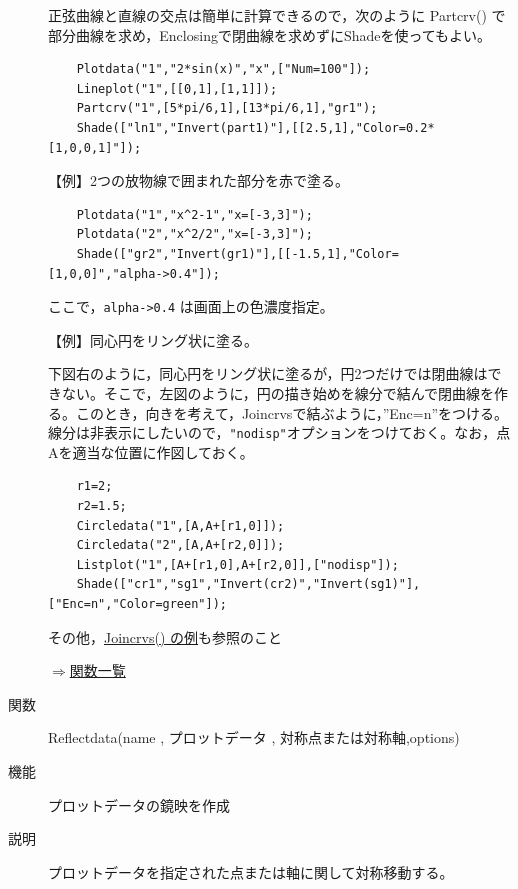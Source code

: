 \documentclass[papersize,a4paper,12pt,uplatex]{jsarticle}
\begin{document}
\begin{description}
正弦曲線と直線の交点は簡単に計算できるので，次のように Partcrv() で部分曲線を求め，Enclosingで閉曲線を求めずにShadeを使ってもよい。
\begin{verbatim}
    Plotdata("1","2*sin(x)","x",["Num=100"]);
    Lineplot("1",[[0,1],[1,1]]);
    Partcrv("1",[5*pi/6,1],[13*pi/6,1],"gr1");
    Shade(["ln1","Invert(part1)"],[[2.5,1],"Color=0.2*[1,0,0,1]"]);
\end{verbatim}


\vspace{\baselineskip}
【例】2つの放物線で囲まれた部分を赤で塗る。
\begin{verbatim}
    Plotdata("1","x^2-1","x=[-3,3]");
    Plotdata("2","x^2/2","x=[-3,3]");
    Shade(["gr2","Invert(gr1)"],[[-1.5,1],"Color=[1,0,0]","alpha->0.4"]);
\end{verbatim}

ここで，\verb|alpha->0.4| は画面上の色濃度指定。

\vspace{\baselineskip}
\begin{center}   \end{center}
  
【例】同心円をリング状に塗る。

  下図右のように，同心円をリング状に塗るが，円2つだけでは閉曲線はできない。そこで，左図のように，円の描き始めを線分で結んで閉曲線を作る。このとき，向きを考えて，Joincrvsで結ぶように，''Enc=n''をつける。線分は非表示にしたいので，\verb|"nodisp"|オプションをつけておく。なお，点Aを適当な位置に作図しておく。

\begin{verbatim}
    r1=2;
    r2=1.5;
    Circledata("1",[A,A+[r1,0]]);
    Circledata("2",[A,A+[r2,0]]);
    Listplot("1",[A+[r1,0],A+[r2,0]],["nodisp"]);
    Shade(["cr1","sg1","Invert(cr2)","Invert(sg1)"],["Enc=n","Color=green"]);
\end{verbatim}
\begin{center}   \end{center}

その他，\hyperlink{joincrvs}{Joincrvs() の例}も参照のこと

\begin{flushright}  \hyperlink{functionlist}{$\Rightarrow$関数一覧}\end{flushright}

\vspace{\baselineskip}
\hypertarget{reflectdata}{}
\item[関数]  Reflectdata(name , プロットデータ , 対称点または対称軸,options)
\item[機能]  プロットデータの鏡映を作成
\item[説明]  プロットデータを指定された点または軸に関して対称移動する。


\end{description}
\end{document}
